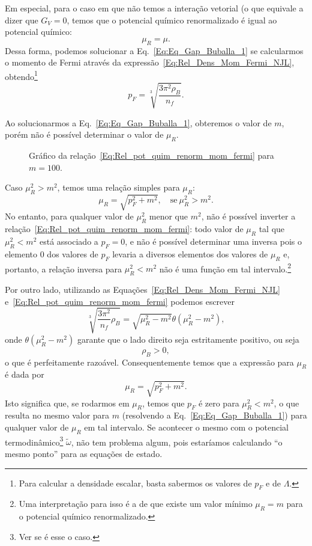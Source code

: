 Em especial, para o caso em que não temos a interação vetorial (o que equivale a dizer que $G_V = 0$, temos que o potencial químico renormalizado é igual ao potencial químico:
\begin{equation}
	\mu_R = \mu.
\end{equation}
%
Dessa forma, podemos solucionar a Eq.~\eqref{Eq:Eq_Gap_Buballa_1} se calcularmos o momento de Fermi através da expressão~\eqref{Eq:Rel_Dens_Mom_Fermi_NJL}, obtendo\footnote{Para calcular a densidade escalar, basta sabermos os valores de $p_F$ e de $\Lambda$.}
\begin{equation}
	p_F = \sqrt[3]{\frac{3\pi^2\rho_B}{n_f}}.
\end{equation}

Ao solucionarmos a Eq.~\eqref{Eq:Eq_Gap_Buballa_1}, obteremos o valor de $m$, porém não é possível determinar o valor de $\mu_R$.
\begin{figure*}
	
	\caption{Gráfico da relação~\eqref{Eq:Rel_pot_quim_renorm_mom_fermi} para $m = 100$.}
\end{figure*}
Caso $\mu_R^2 > m^2$, temos uma relação simples para $\mu_R$:
\begin{equation}
	\mu_R = \sqrt{p_F^2 + m^2}, \quad \textrm{se}~ \mu_R^2 > m^2.
\end{equation}
%
No entanto, para qualquer valor de $\mu_R^2$ menor que $m^2$, não é possível inverter a relação~\eqref{Eq:Rel_pot_quim_renorm_mom_fermi}: todo valor de $\mu_R$ tal que $\mu_R^2 < m^2$ está associado a $p_F = 0$, e não é possível determinar uma inversa pois o elemento $0$ dos valores de $p_F$ levaria a diversos elementos dos valores de $\mu_R$ e, portanto, a relação inversa para $\mu_R^2 < m^2$ não é uma função em tal intervalo.\footnote{Uma interpretação para isso é a de que existe um valor mínimo $\mu_R = m$ para o potencial químico renormalizado.}

Por outro lado, utilizando as Equações~\eqref{Eq:Rel_Dens_Mom_Fermi_NJL} e~\eqref{Eq:Rel_pot_quim_renorm_mom_fermi} podemos escrever
\begin{equation}
	\sqrt[3]{\frac{3\pi^2}{n_f} \rho_B} = \sqrt{\mu_R^2 - m^2}\theta(\mu_R^2 - m^2),
\end{equation}
%
onde $\theta(\mu_R^2 - m^2)$ garante que o lado direito seja estritamente positivo, ou seja
\begin{equation}
	\rho_B > 0,
\end{equation}
%
o que é perfeitamente razoável. Consequentemente temos que a expressão para $\mu_R$ é dada por
\begin{equation}
	\mu_R = \sqrt{p_F^2 + m^2}.
\end{equation}
%
Isto significa que, se rodarmos em $\mu_R$, temos que $p_F$ é zero para $\mu_R^2 < m^2$, o que resulta no mesmo valor para $m$ (resolvendo a Eq.~\eqref{Eq:Eq_Gap_Buballa_1}) para qualquer valor de $\mu_R$ em tal intervalo. Se acontecer o mesmo com o potencial termodinâmico\footnote{Ver se é esse o caso.} $\tilde{\omega}$, não tem problema algum, pois estaríamos calculando ``o mesmo ponto'' para as equações de estado.


